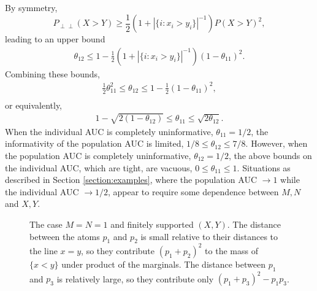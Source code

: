 \documentclass[12pt]{article}
\DeclareMathOperator{\AUC}{AUC}
\renewcommand{\P}{P}
\newcommand{\cind}{\perp \!\!\! \perp}
\newcommand{\aucindiv}{\theta_{11}}%
\newcommand{\aucpop}{\theta_{12}}%
\begin{document}
By symmetry,
$$
\P_{\cind}(X>Y) \ge \frac{1}{2}(1+|\{i:x_i>y_i\}|^{-1})\P(X>Y)^2,
$$
leading to an upper bound
\begin{align}
  \aucpop \le 1 - \frac{1}{2}(1+|\{i:x_i>y_i\}|^{-1})(1-\aucindiv)^2.
\end{align}
Combining these bounds,
\begin{align}
  \frac{1}{2}\aucindiv^2 \le \aucpop \le 1 - \frac{1}{2}(1-\aucindiv)^2,\\
\end{align}
or equivalently,
\begin{align}
  1-\sqrt{2(1-\aucpop)} \le \aucindiv \le \sqrt{2\aucpop}.
\end{align}
When the individual AUC is completely uninformative, $\aucindiv=1/2$,
the informativity of the population AUC is limited,
$1/8 \le \aucpop \le 7/8$. However, when the population AUC is
completely uninformative, $\aucpop=1/2$, the above bounds on the individual AUC, which are tight, are vacuous, $0\le\aucindiv\le 1$. Situations as described in Section \ref{section:examples}, where the population AUC $\to 1$ while the individual AUC $\to 1/2$, appear to require some dependence between $M,N$ and $X,Y$. %



\begin{figure}[!tbp]
  \centering
  \caption{The case $M=N=1$ and finitely supported $(X,Y)$. The
    distance between the atoms $p_1$ and $p_2$ is small relative to
    their distances to the line $x=y$, so they contribute
    $(p_1+p_2)^2$ to the mass of $\{x<y\}$ under product of the
    marginals. The distance between $p_1$ and $p_3$ is relatively
    large, so they contribute only
    $(p_1+p_3)^2-p_1p_3$.}  \label{fig:inequality}
\end{figure}
\end{document}
